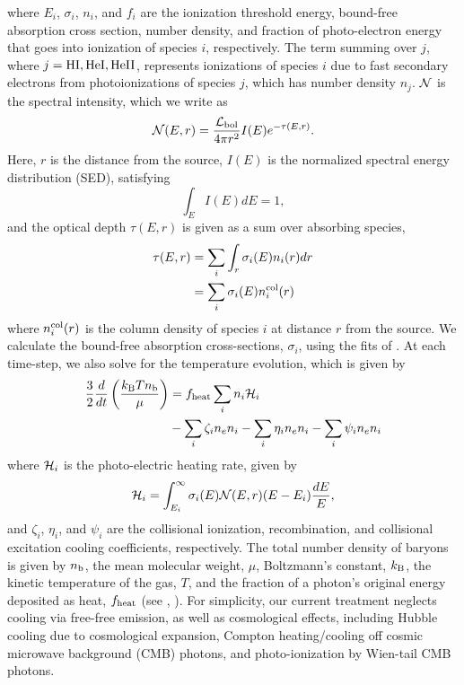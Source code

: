 \documentclass[preprint2]{aastex}              %
\begin{document}
where $E_i$, $\sigma_i$, $n_i$, and $f_i$ are the ionization threshold energy, bound-free absorption cross section, number density, and fraction of photo-electron energy that goes into ionization of species $i$, respectively. The term summing over $j$, where $j = \text{HI}, \text{HeI}, \text{HeII}$, represents ionizations of species $i$ due to fast secondary electrons from photoionizations of species $j$, which has number density $n_j$.  $\mathcal{N}$ is the spectral intensity, which we write as
\begin{equation}
    \mathcal{N}(E, r) = \frac{\mathcal{L}_{\text{bol}}}{4\pi r^2} I(E) e^{-\tau(E, r)} . \label{eq:Spectrum}
\end{equation}
Here, $r$ is the distance from the source, $I(E)$ is the normalized spectral energy distribution (SED), satisfying
\begin{equation}
    \int_E I(E) dE = 1 ,
\end{equation}
and the optical depth $\tau(E, r)$ is given as a sum over absorbing species,
\begin{align}
    \tau(E, r) & = \sum_i \int_r \sigma_i(E) n_i(r) dr \nonumber \\
               & = \sum_i \sigma_i(E) n_i^{\text{col}}(r) \label{eq:OpticalDepth}
\end{align}
where $n_i^{\text{col}}(r)$ is the column density of species $i$ at distance $r$ from the source.
We calculate the bound-free absorption cross-sections, $\sigma_i$, using the fits of \citet{Verner1996}.  At each time-step, we also solve for the temperature evolution, which is given by
\begin{align}
    \frac{3}{2}\frac{d}{dt}\left(\frac{k_{\text{B}} T n_{\text{b}}}{\mu}\right) & = f_{\text{heat}} \sum_i n_i \mathcal{H}_i \nonumber \\
    & - \sum_i \zeta_i n_e n_i - \sum_i \eta_i n_e n_i - \sum_i \psi_i n_e n_i \label{eq:TemperatureEvolution} 
\end{align}
where $\mathcal{H}_i$ is the photo-electric heating rate, given by
\begin{equation}
    \mathcal{H}_i = \int_{E_i}^{\infty} \sigma_i(E) \mathcal{N}(E, r)(E - E_i) \frac{dE}{E} \label{eq:HeatingRate} ,
\end{equation}    
and $\zeta_i$, $\eta_i$, and $\psi_i$ are the collisional ionization, recombination, and collisional excitation cooling coefficients, respectively. The total number density of baryons is given by $n_{\text{b}}$, the mean molecular weight, $\mu$, Boltzmann's constant, $k_{\text{B}}$, the kinetic temperature of the gas, $T$, and the fraction of a photon's original energy deposited as heat, $f_{\text{heat}}$ (see \citet{Shull1985}, \citet{Furlanetto2010}).  For simplicity, our current treatment neglects cooling via free-free emission, as well as cosmological effects, including Hubble cooling due to cosmological expansion, Compton heating/cooling off cosmic microwave background (CMB) photons, and photo-ionization by Wien-tail CMB photons. 
\end{document}
